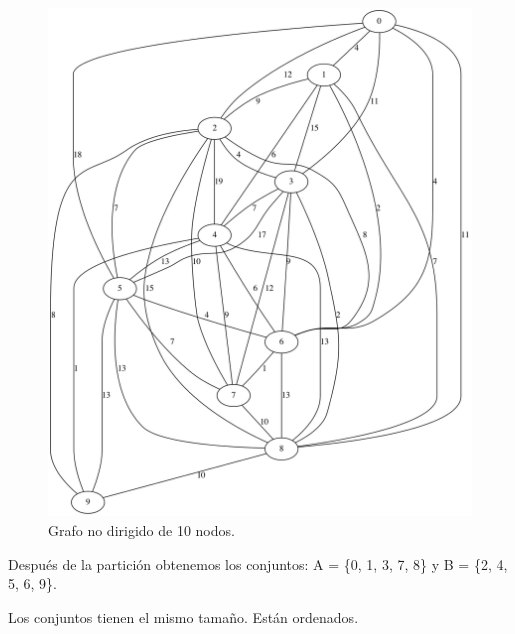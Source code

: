 \renewcommand{\figurename}{Figura}
\begin{figure}[h]
	\centering
	\includegraphics[scale=0.25]{Figures/10_dataset}
	\vspace{1mm}
	\caption{Grafo no dirigido de 10 nodos.}
	\label{grafo_3}
\end{figure}

Después de la partición obtenemos los conjuntos: A = \{0, 1, 3, 7, 8\} y B = \{2, 4, 5, 6, 9\}.

Los conjuntos tienen el mismo tamaño. Están ordenados.